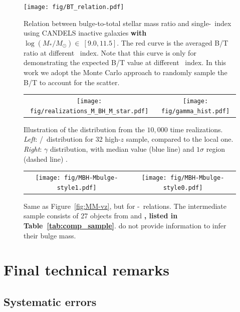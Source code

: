\documentclass[apj]{emulateapj}
\begin{document}
\begin{figure}
\centering
{
\texttt{[image: fig/BT\_relation.pdf]}
}
\caption{\label{fig:BT-n_relation} 
Relation between bulge-to-total stellar mass ratio and single-\sersic\ index using CANDELS inactive galaxies {\bf with $\log (M_*/M_{\odot})\in~[9.0, 11.5]$}. The red curve is the averaged B/T ratio at different \sersic\ index. Note that this curve is only for demonstrating the expected B/T value at different \sersic\ index. In this work we adopt the Monte Carlo approach to randomly sample the B/T to account for the scatter.
}
\end{figure} 

\begin{figure}
\centering
\begin{tabular}{c c}
{\texttt{[image: fig/realizations\_M\_BH\_M\_star.pdf]}}&
{\texttt{[image: fig/gamma\_hist.pdf]}}\\
\end{tabular}
\caption{\label{fig:gamma_hist} 
Illustration of the distribution from the $10,000$ time realizations. {\it Left}: \mbh/\smass\ distribution for 32 high-$z$ sample, compared to the local one. {\it Right}: $\gamma$ distribution, with median value (blue line) and $1\sigma$ region (dashed line) .
}
\end{figure}

\begin{figure}
\centering
\begin{tabular}{c c}
{\texttt{[image: fig/MBH-Mbulge-style1.pdf]}}&
{\texttt{[image: fig/MBH-Mbulge-style0.pdf]}}\\
\end{tabular}
\caption{\label{fig:MM_bulge-vz}
Same as Figure~\ref{fig:MM-vz}, but for \mbh-\bmass\ relations. The intermediate sample consists of 27 objects from \citet{Bennert11} and \citet{SS13}{\bf , listed in Table~\ref{tab:comp_sample}}. \citet{Cisternas2011} do not provide information to infer their bulge mass.}
\end{figure} 


\section{Final technical remarks}
\label{sec:dis}


\subsection{Systematic errors}\label{sec:sysm_err}
\end{document}

